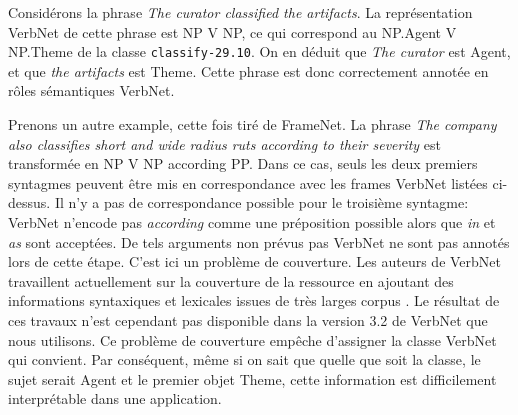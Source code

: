 Considérons la phrase \emph{The curator classified the artifacts}. La
représentation VerbNet de cette phrase est NP V NP, ce qui correspond au
NP.Agent V NP.Theme de la classe \texttt{classify-29.10}. On en déduit que
\emph{The curator} est Agent, et que \emph{the artifacts} est Theme. Cette
phrase est donc correctement annotée en rôles sémantiques VerbNet.

Prenons un autre example, cette fois tiré de FrameNet. La phrase \emph{The
company also classifies short and wide radius ruts according to their severity}
est transformée en NP V NP according PP. Dans ce cas, seuls les deux premiers
syntagmes peuvent être mis en correspondance avec les frames VerbNet listées
ci-dessus. Il n'y a pas de correspondance possible pour le troisième syntagme:
VerbNet n'encode pas \emph{according} comme une préposition possible alors que
\emph{in} et \emph{as} sont acceptées. De tels arguments non prévus pas VerbNet
ne sont pas annotés lors de cette étape. C'est ici un problème de couverture.
Les auteurs de VerbNet travaillent actuellement sur la couverture de la
ressource en ajoutant des informations syntaxiques et lexicales issues de très
larges corpus \citep{bonial2013expanding}. Le résultat de ces travaux n'est
cependant pas disponible dans la version 3.2 de VerbNet que nous utilisons. Ce
problème de couverture empêche d'assigner la classe VerbNet qui convient. Par
conséquent, même si on sait que quelle que soit la classe, le sujet serait
Agent et le premier objet Theme, cette information est difficilement
interprétable dans une application.





